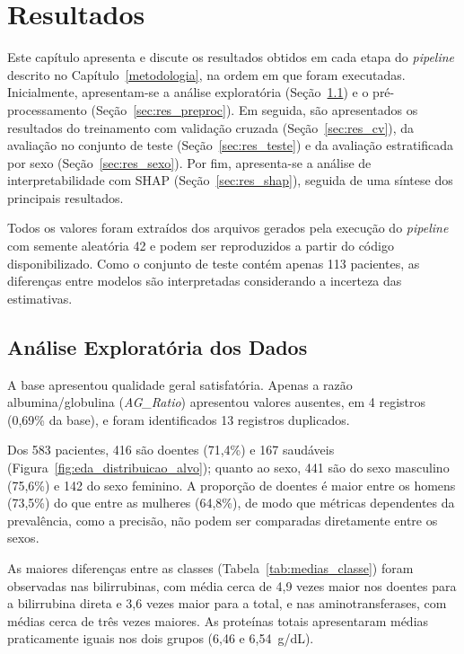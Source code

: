 \chapter{Resultados} \label{cap:resultados}

Este capítulo apresenta e discute os resultados obtidos em cada etapa do \textit{pipeline} descrito no Capítulo~\ref{metodologia}, na ordem em que foram executadas. Inicialmente, apresentam-se a análise exploratória (Seção~\ref{sec:res_aed}) e o pré-processamento (Seção~\ref{sec:res_preproc}). Em seguida, são apresentados os resultados do treinamento com validação cruzada (Seção~\ref{sec:res_cv}), da avaliação no conjunto de teste (Seção~\ref{sec:res_teste}) e da avaliação estratificada por sexo (Seção~\ref{sec:res_sexo}). Por fim, apresenta-se a análise de interpretabilidade com SHAP (Seção~\ref{sec:res_shap}), seguida de uma síntese dos principais resultados.

Todos os valores foram extraídos dos arquivos gerados pela execução do \textit{pipeline} com semente aleatória 42 e podem ser reproduzidos a partir do código disponibilizado. Como o conjunto de teste contém apenas 113 pacientes, as diferenças entre modelos são interpretadas considerando a incerteza das estimativas.

\section{Análise Exploratória dos Dados}
\label{sec:res_aed}

A base apresentou qualidade geral satisfatória. Apenas a razão albumina/globulina (\textit{AG\_Ratio}) apresentou valores ausentes, em 4 registros (0,69\% da base), e foram identificados 13 registros duplicados.

Dos 583 pacientes, 416 são doentes (71,4\%) e 167 saudáveis (Figura~\ref{fig:eda_distribuicao_alvo}); quanto ao sexo, 441 são do sexo masculino (75,6\%) e 142 do sexo feminino. A proporção de doentes é maior entre os homens (73,5\%) do que entre as mulheres (64,8\%), de modo que métricas dependentes da prevalência, como a precisão, não podem ser comparadas diretamente entre os sexos.

As maiores diferenças entre as classes (Tabela~\ref{tab:medias_classe}) foram observadas nas bilirrubinas, com média cerca de 4,9 vezes maior nos doentes para a bilirrubina direta e 3,6 vezes maior para a total, e nas aminotransferases, com médias cerca de três vezes maiores. As proteínas totais apresentaram médias praticamente iguais nos dois grupos (6,46 e 6,54~g/dL).

